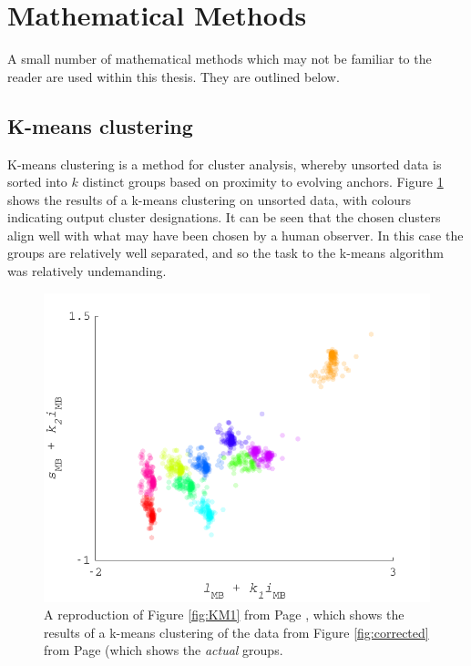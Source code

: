 \section{Mathematical Methods}

A small number of mathematical methods which may not be familiar to the reader are used within this thesis. They are outlined below.

\subsection{K-means clustering}

K-means clustering is a method for cluster analysis, whereby unsorted data is sorted into $k$ distinct groups based on proximity to evolving anchors. Figure \ref{fig:KM1lr} shows the results of a k-means clustering on unsorted data, with colours indicating output cluster designations. It can be seen that the chosen clusters align well with what may have been chosen by a human observer. In this case the groups are relatively well separated, and so the task to the k-means algorithm was relatively undemanding.

\begin{figure}[htbp]
 \includegraphics[max width=\textwidth]{figs/comp/KMeansMarkDemo/1.pdf}
 \caption{A reproduction of Figure \ref{fig:KM1} from Page \pageref{fig:KM1}, which shows the results of a k-means clustering of the data from Figure \ref{fig:corrected} from Page \pageref{fig:corrected} (which shows the \emph{actual} groups.}
 \label{fig:KM1lr}
\end{figure} 

